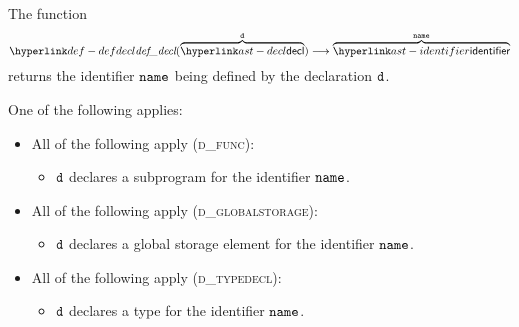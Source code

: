 \FormallyParagraph
\begin{mathpar}
\end{mathpar}

\hypertarget{def-defdecl}{}
The function
\[
\defdecl(\overname{\decl}{\vd}) \aslto \overname{\identifier}{\name}
\]
returns the identifier $\name$ being defined by the declaration $\vd$.

\ProseParagraph
One of the following applies:
\begin{itemize}
  \item All of the following apply (\textsc{d\_func}):
  \begin{itemize}
    \item $\vd$ declares a subprogram for the identifier $\name$.
  \end{itemize}

  \item All of the following apply (\textsc{d\_globalstorage}):
  \begin{itemize}
    \item $\vd$ declares a global storage element for the identifier $\name$.
  \end{itemize}

  \item All of the following apply (\textsc{d\_typedecl}):
  \begin{itemize}
    \item $\vd$ declares a type for the identifier $\name$.
  \end{itemize}
\end{itemize}


